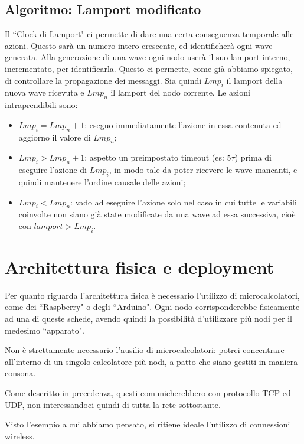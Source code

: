\documentclass{memoir}
\begin{document}
\subsection{Algoritmo: Lamport modificato}
Il ``Clock di Lamport" ci permette di dare una certa conseguenza temporale alle azioni.
	   Questo sarà un numero intero crescente, ed identificherà ogni wave generata. Alla
	   generazione di una wave ogni nodo userà il suo lamport interno, incrementato, per
	   identificarla. Questo ci permette, come già abbiamo spiegato, di controllare la
	   propagazione dei messaggi. Sia quindi $Lmp_i$ il lamport della nuova wave ricevuta
	   e $Lmp_n$ il lamport del nodo corrente. Le azioni intraprendibili sono:
\begin{itemize}
	\item $Lmp_i = Lmp_n + 1$: eseguo immediatamente l'azione in essa contenuta ed aggiorno
	   il valore di $Lmp_n$;
	\item $Lmp_i > Lmp_n + 1$: aspetto un preimpostato timeout (es: $5\tau$) prima di
	   eseguire l'azione di $Lmp_i$, in modo tale da poter ricevere le wave mancanti, e
	   quindi mantenere l'ordine causale delle azioni;
	\item $Lmp_i < Lmp_n$: vado ad eseguire l'azione solo nel caso in cui tutte le variabili
	   coinvolte non siano già state modificate da una wave ad essa successiva, cioè con
	   $lamport > Lmp_i$.
\end{itemize}

\section{Architettura fisica e deployment}
Per quanto riguarda l'architettura fisica è necessario l'utilizzo di microcalcolatori,
	   come dei ``Raspberry" o degli ``Arduino". Ogni nodo corrisponderebbe fisicamente
	   ad una di queste schede, avendo quindi la possibilità d'utilizzare più nodi
	   per
	   il medesimo ``apparato".

Non è strettamente necessario l'ausilio di microcalcolatori: potrei concentrare
	   all'interno di un singolo calcolatore più nodi, a patto che siano gestiti in
	   maniera
	   consona. 

Come descritto in precedenza, questi comunicherebbero con protocollo TCP ed UDP,
	   non interessandoci quindi di tutta la rete sottostante.

Visto l'esempio a cui abbiamo pensato, si ritiene ideale l'utilizzo di connessioni
	   wireless.
\end{document}
